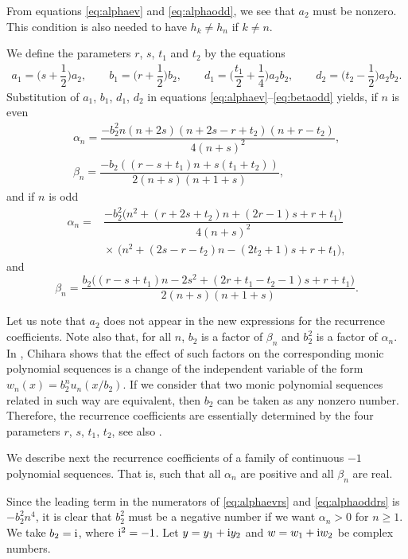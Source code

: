 \documentclass[pdftex]{sigma}
\numberwithin{equation}{section}
\begin{document}
From equations \eqref{eq:alphaev} and \eqref{eq:alphaodd}, we see that $a_2$ must be nonzero. This condition is also needed to have $h_k \ne h_n$ if $ k \ne n$.

We define the parameters $r$, $s$, $t_1$ and $t_2$ by the equations
\begin{gather*}
a_1=\biggl(s + \dfrac{1}{2}\biggr) a_2,\qquad b_1=\biggl(r+\dfrac{1}{2}\biggr) b_2,\qquad d_1=\biggl(\dfrac{t_1}{2} +\dfrac{1}{4}\biggr) a_2 b_2, \qquad d_2=\biggl( t_2- \dfrac{1}{2}\biggr) a_2 b_2.
\end{gather*}
Substitution of $a_1$, $b_1$, $d_1$, $d_2$ in equations \eqref{eq:alphaev}--\eqref{eq:betaodd} yields, if $n$ is even
\begin{gather}
\alpha_n = \dfrac{-b_2^2n ( n+ 2 s) ( n+ 2 s -r + t_2) ( n+ r - t_2)}{4 (n+s)^2},\\
	\beta_n =\dfrac{-b_2((r-s+t_1) n +s (t_1+t_2))}{2 (n+s)(n+1+s)},\label{eq:alphaevrs}
\end{gather}
 and if $n$ is odd
\begin{align}
\alpha_n ={}& \dfrac{-b_2^2\bigl(n^2+(r+2s+t_2) n + (2 r -1)s + r + t_1\bigr)}{4(n+s)^2} \\
 	 &{}{\times} \, \bigl(n^2+(2s -r - t_2) n -(2 t_2 + 1)s + r + t_1\bigr),\label{eq:alphaoddrs}
\end{align}
and
\begin{equation}\label{eq:betaoddrs}
	\beta_n= \dfrac{b_2\bigl((r-s+t_1) n -2 s^2 +( 2r +t_1 - t_2-1)s + r + t_1\bigr)}{2(n+s)( n+1+s)}.
\end{equation}

Let us note that $a_2$ does not appear in the new expressions for the recurrence coefficients. Note also that, for all $n$, $b_2$ is a factor of $\beta_n$ and $b_2^2$ is a factor of $\alpha_n$. In \cite[Appendix, p.~215]{Chi}, Chihara shows that the effect of such factors on the corresponding monic polynomial sequences is a change of the independent variable of the form $w_n(x)=b_2^n u_n(x/b_2)$. If we consider that two monic polynomial sequences related in such way are equivalent, then $b_2$ can be taken as any nonzero number. Therefore, the recurrence coefficients are essentially determined by the four parameters $r$, $s$, $t_1$, $t_2$, see also \cite[Remark~2.5]{K3}.

We describe next the recurrence coefficients of a family of continuous $-1$ polynomial sequences. That is, such that all $\alpha_n$ are positive and all $\beta_n$ are real.

Since the leading term in the numerators of \eqref{eq:alphaevrs} and \eqref{eq:alphaoddrs} is $- b_2^2 n^4$, it is clear that $b_2^2$ must be a negative number if we want $\alpha_n >0$ for $n\ge 1$. We take $b_2={\rm i}$, where ${\rm i}^2=-1$.
Let $y=y_1 + {\rm i} y_2$ and $w=w_1 + {\rm i} w_2$ be complex numbers.
\end{document}
